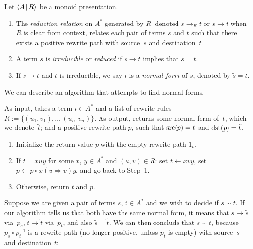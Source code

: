 \documentclass[../generics]{subfiles}
\begin{document}
\begin{definition}
Let $\langle A\,|\,R\rangle$ be a monoid presentation.
\begin{enumerate}
\item The \emph{reduction relation} on $A^*$ generated by $R$, denoted \index{$\rightarrow$}$s\rightarrow_R t$ or $s\rightarrow t$ when $R$ is clear from context, relates each pair of terms $s$ and $t$ such that there exists a positive rewrite path with source~$s$ and destination~$t$.

\item A term $s$ is \emph{irreducible} or \emph{reduced} if $s\rightarrow t$ implies that $s=t$.

\item If $s\rightarrow t$ and $t$ is irreducible, we say $t$ is a \emph{normal form} of $s$, denoted by $\tilde{s} = t$.
\end{enumerate}
\end{definition}

We can describe an algorithm that attempts to find normal forms.

\begin{algorithm}\label{term reduction algo}
As input, takes a term $t\in A^*$ and a list of rewrite rules $R:=\{(u_1,v_1),\ldots\,(u_n,v_n)\}$. As output, returns some normal form of~$t$, which we denote~$\tilde{t}$; and a positive rewrite path $p$, such that $\operatorname{src}(p)=t$ and $\operatorname{dst}(p)=\tilde{t}$.
\begin{enumerate}
\item Initialize the return value $p$ with the empty rewrite path $1_t$.
\item If $t=xuy$ for some $x$, $y\in A^*$ and $(u,v)\in R$: set $t\leftarrow xvy$, set $p\leftarrow p \circ x(u\Rightarrow v)y$, and go back to Step~1.
\item Otherwise, return $t$ and $p$.
\end{enumerate}
\end{algorithm}

Suppose we are given a pair of terms $s$, $t\in A^*$ and we wish to decide if $s\sim t$. If our algorithm tells us that both have the same normal form, it means that $s\rightarrow \tilde{s}$ via~$p_s$, $t\rightarrow \tilde{t}$ via~$p_t$, and also $\tilde{s}=\tilde{t}$. We can then conclude that $s\sim t$, because $p_s \circ p_t^{-1}$ is a rewrite path (no longer positive, unless $p_t$ is empty) with source~$s$ and destination~$t$:
\end{document}
